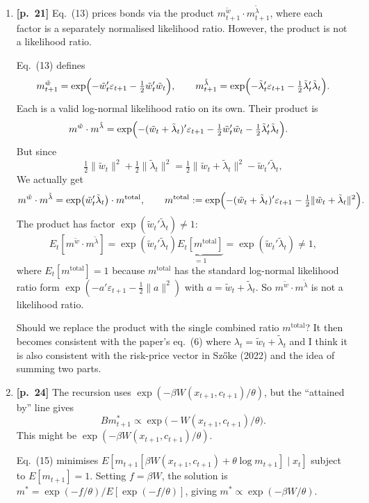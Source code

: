 \documentclass[11pt]{article}
\begin{document}
\begin{enumerate}[label=\textbf{M\arabic*.}, leftmargin=*, itemsep=10pt, listparindent=1em]
So I think the current formulation mixes their convention with the setup in \S8.2.

\item \textbf{[p.~21]}
Eq.~(13) prices bonds via the product $m_{t+1}^{\tilde w}\cdot m_{t+1}^{\tilde\lambda}$, 
where each factor is a separately normalised likelihood ratio. However, 
the product is not a likelihood ratio.

Eq.~(13) defines
$$
  m_{t+1}^{\tilde w} = \exp \Bigl(-\tilde w_t'\varepsilon_{t+1} - \tfrac{1}{2}\tilde w_t'\tilde w_t\Bigr),
  \qquad
  m_{t+1}^{\tilde\lambda} = \exp \Bigl(-\tilde\lambda_t'\varepsilon_{t+1} - \tfrac{1}{2}\tilde\lambda_t'\tilde\lambda_t\Bigr).
$$
Each is a valid log-normal likelihood ratio on its own.  Their product is
\begin{align*}
  m^{\tilde w}\cdot m^{\tilde\lambda}
  &= \exp \Bigl(-(\tilde w_t+\tilde\lambda_t)'\varepsilon_{t+1}
     - \tfrac{1}{2}\tilde w_t'\tilde w_t - \tfrac{1}{2}\tilde\lambda_t'\tilde\lambda_t\Bigr).
\end{align*}
But since
$$
  \tfrac{1}{2}\|\tilde w_t\|^2 + \tfrac{1}{2}\|\tilde\lambda_t\|^2
  = \tfrac{1}{2}\|\tilde w_t+\tilde\lambda_t\|^2 - \tilde w_t'\tilde\lambda_t,
$$
We actually get
$$
  m^{\tilde w}\cdot m^{\tilde\lambda}
  = \exp\bigl(\tilde w_t'\tilde\lambda_t\bigr)\cdot m^{\mathrm{total}},
  \qquad
  m^{\mathrm{total}} := \exp \Bigl(-(\tilde w_t+\tilde\lambda_t)'\varepsilon_{t+1} - \tfrac{1}{2}\|\tilde w_t+\tilde\lambda_t\|^2\Bigr).
$$
The product has factor $\exp(\tilde w_t'\tilde\lambda_t)\ne 1$:
$$
  E_t[m^{\tilde w}\cdot m^{\tilde\lambda}]
  = \exp(\tilde w_t'\tilde\lambda_t) \underbrace{E_t[m^{\mathrm{total}}]}_{=1}
  = \exp(\tilde w_t'\tilde\lambda_t) \ne 1,
$$
where $E_t[m^{\mathrm{total}}]=1$ because $m^{\mathrm{total}}$ has the standard log-normal likelihood ratio form $\exp(-a'\varepsilon_{t+1}-\frac{1}{2}\|a\|^2)$ with $a=\tilde w_t+\tilde\lambda_t$. 
So $m^{\tilde w}\cdot m^{\tilde\lambda}$ is not a likelihood ratio. 

Should we replace the product with the single combined ratio $m^{\mathrm{total}}$? 
It then becomes consistent with the paper's eq.~(6) where $\lambda_t = \tilde w_t + \tilde\lambda_t$ and I think it is also consistent with the risk-price vector in 
Sz\H{o}ke (2022) and the idea of summing two parts.


\item \textbf{[p.~24]} 
The recursion uses $\exp(-\beta W(x_{t+1},c_{t+1})/\theta)$, but the ``attained by'' line gives
$$B
  m_{t+1}^* \propto \exp \bigl(-W(x_{t+1},c_{t+1})/\theta\bigr).
$$
This might be $\exp(-\beta W(x_{t+1},c_{t+1})/\theta)$.

Eq.~(15) minimises $E[m_{t+1}[\beta W(x_{t+1},c_{t+1}) + \theta\log m_{t+1}] \mid x_t]$ subject to $E[m_{t+1}]=1$. Setting $f=\beta W$, the solution is $m^* = \exp(-f/\theta)/E[\exp(-f/\theta)]$, giving $m^*\propto\exp(-\beta W/\theta)$.

\end{enumerate}
\end{document}
